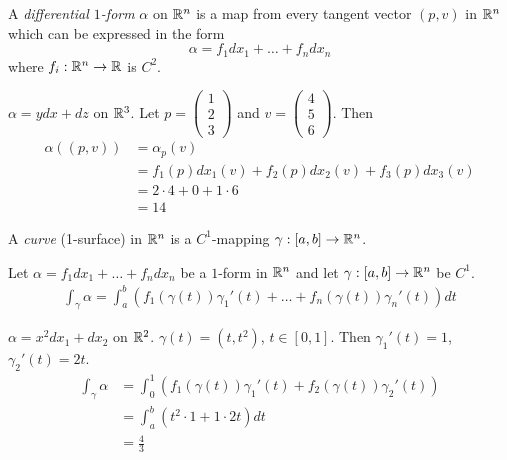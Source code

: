 \documentclass[11pt]{article}
\begin{document}
\begin{definition} A \emph{differential $1$-form} $\alpha$ on $\mathbb{R}^n$ is a map from every tangent vector $(p, v)$ in $\mathbb{R}^n$ which can be expressed in the form $$\alpha = f_1dx_1 + \dots + f_ndx_n$$ where $f_i: \mathbb{R}^n \to \mathbb{R}$ is $C^2$.
\end{definition}

\begin{example} $\alpha = ydx + dz$ on $\mathbb{R}^3$. Let $p = \begin{pmatrix} 1 \\ 2 \\ 3 \end{pmatrix}$ and $v = \begin{pmatrix} 4 \\ 5 \\ 6 \end{pmatrix}$. Then \begin{align*} \alpha((p, v)) & = \alpha_p(v) \\ & = f_1(p) dx_1(v) + f_2(p) dx_2(v) + f_3(p) dx_3(v) \\ & = 2 \cdot 4 + 0 + 1 \cdot 6 \\ & = 14 \end{align*}
\end{example}

\begin{definition} A \emph{curve} (1-surface) in $\mathbb{R}^n$ is a $C^1$-mapping $\gamma: [a, b] \to \mathbb{R}^n$.
\end{definition}

\begin{definition} Let $\alpha = f_1dx_1 + \dots + f_ndx_n$ be a $1$-form in $\mathbb{R}^n$ and let  $\gamma: [a, b] \to \mathbb{R}^{n}$ be $C^1$. \begin{align*} \int_{\gamma} \alpha = \int_a^b (f_1 (\gamma(t))\gamma_1'(t) + \dots + f_n (\gamma(t)) \gamma_n'(t)) dt \end{align*}
\end{definition}

\begin{example} $\alpha = x^2dx_1 + dx_2$ on $\mathbb{R}^2$. $\gamma(t) = (t, t^2)$, $t \in [0, 1]$. Then $\gamma_1' (t) = 1$, $\gamma_2'(t) = 2t$. \begin{align*} \int_{\gamma} \alpha & = \int_0^1 (f_1(\gamma(t)) \gamma_1' (t) + f_2 (\gamma(t)) \gamma_2'(t)) \\ & =\int_a^b (t^2 \cdot 1 +1  \cdot 2t) dt \\ & = \frac{4}{3} \end{align*}
\end{example}
\end{document}
